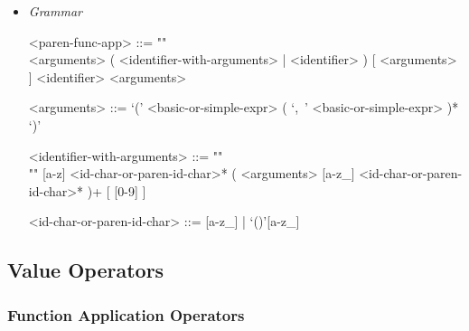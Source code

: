 \documentclass{article}
\begin{document}
\begin{itemize}
\item \textit{Grammar}
\begin{grammar}
<paren-func-app> ::= ""\\
<arguments> ( <identifier-with-arguments> | <identifier> ) [ <arguments> ]
\alt <identifier> <arguments>

<arguments> ::=
`(' <basic-or-simple-expr> ( `,\ ' <basic-or-simple-expr> )* `)'

<identifier-with-arguments> ::= ""\\""
[a-z] <id-char-or-paren-id-char>* ( <arguments> [a-z_]
<id-char-or-paren-id-char>* )+ [ [0-9] ]

<id-char-or-paren-id-char> ::= [a-z_] | `()'[a-z_]
\end{grammar}

\end{itemize}

\subsection{Value Operators}

\subsubsection{Function Application Operators}
\end{document}
